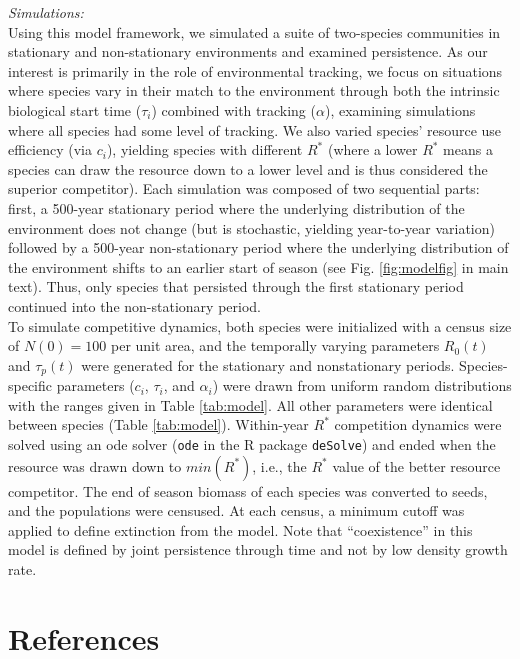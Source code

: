 \documentclass[11pt,letter]{article}
\begin{document}
\noindent \emph{Simulations:}\\
Using this model framework, we simulated a suite of two-species communities in stationary and non-stationary environments and examined persistence. As our interest is primarily in the role of environmental tracking, we focus on situations where species vary in their match to the environment through both the intrinsic biological start time ($\tau_i$) combined with tracking ($\alpha$), examining simulations where all species had some level of tracking. We also varied species' resource use efficiency (via $c_i$), yielding species with different $R^*$ (where a lower $R^*$ means a species can draw the resource down to a lower level and is thus considered the superior competitor). Each simulation was composed of two sequential parts: first, a 500-year stationary period where the underlying distribution of the environment does not change (but is stochastic, yielding year-to-year variation) followed by a 500-year non-stationary period where the underlying distribution of the environment shifts to an earlier start of season (see Fig. \ref{fig:modelfig} in main text). Thus, only species that persisted through the first stationary period continued into the non-stationary period.  \\

To simulate competitive dynamics, both species were initialized with a census size of $N(0) = 100$ per unit area, and the temporally varying parameters $R_0(t)$ and $\tau_{p}(t)$ were generated for the stationary and nonstationary periods. Species-specific parameters ($c_{i}$, $\tau_{i}$, and $\alpha_{i}$) were drawn from uniform random distributions with the ranges given in Table \ref{tab:model}.  All other parameters were identical between species (Table \ref{tab:model}).  Within-year $R^{*}$ competition dynamics were solved using an ode solver (\verb|ode| in the R package \verb|deSolve|) and ended when the resource was drawn down to $min(R^{*})$, i.e., the $R^{*}$ value of the better resource competitor.  The end of season biomass of each species was converted to seeds, and the populations were censused.  At each census, a minimum cutoff was applied to define extinction from the model.  Note that ``coexistence'' in this model is defined by joint persistence through time and not by low density growth rate. 
\clearpage

\section{References}


\end{document}
